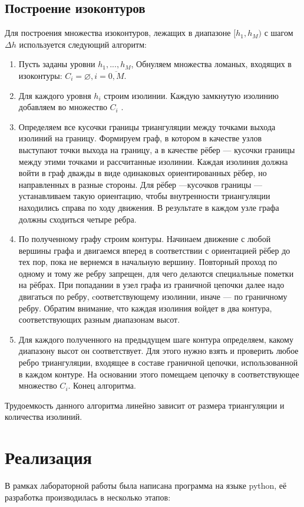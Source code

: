 \documentclass[12pt,a4paper,oneside]{extarticle}
\begin{document}
    \subsection{Построение изоконтуров}
        Для построения множества изоконтуров, лежащих в диапазоне $[h_1, h_M)$ с шагом $\Delta h$ используется следующий алгоритм:
         \begin{enumerate}
            \item Пусть заданы уровни $h_1 ,..., h_M$, Обнуляем множества ломаных, входящих в изоконтуры: $C_i = \varnothing, i = \overline{0, M}$.
            \item Для каждого уровня $h_i$ строим изолинии. Каждую замкнутую изолинию добавляем во множество $C_i$ .
            \item Определяем все кусочки границы триангуляции между точками выхода изолиний на границу. Формируем граф, в котором в качестве узлов выступают точки выхода на границу, а в качестве рёбер --- кусочки границы между этими точками и рассчитанные изолинии. Каждая изолиния должна войти в граф дважды в виде одинаковых ориентированных рёбер, но направленных в разные стороны. Для рёбер ---кусочков границы --- устанавливаем такую ориентацию, чтобы внутренности триангуляции находились справа по ходу движения. В результате в каждом узле графа должны сходиться четыре ребра.
            \item По полученному графу строим контуры. Начинаем движение с любой вершины графа и двигаемся вперед в соответствии с ориентацией рёбер до тех пор, пока не вернемся в начальную вершину. Повторный проход по одному и тому же ребру запрещен, для чего делаются специальные пометки на рёбрах. При попадании в узел графа из граничной цепочки далее надо двигаться по ребру, cоответствующему изолинии, иначе --- по граничному ребру. Обратим внимание, что каждая изолиния войдет в два контура, соответствующих разным диапазонам высот.
            \item Для каждого полученного на предыдущем шаге контура определяем, какому диапазону высот он соответствует. Для этого нужно взять и проверить любое ребро триангуляции, входящее в составе граничной цепочки, использованной в каждом контуре. На основании этого помещаем цепочку в соответствующее множество $C_i$. Конец алгоритма.
        \end{enumerate}

        Трудоемкость данного алгоритма линейно зависит от размера триангуляции и количества изолиний.
        
\section{Реализация}
    В рамках лабораторной работы была написана программа на языке python, её разработка производилась в несколько этапов:
\end{document}
